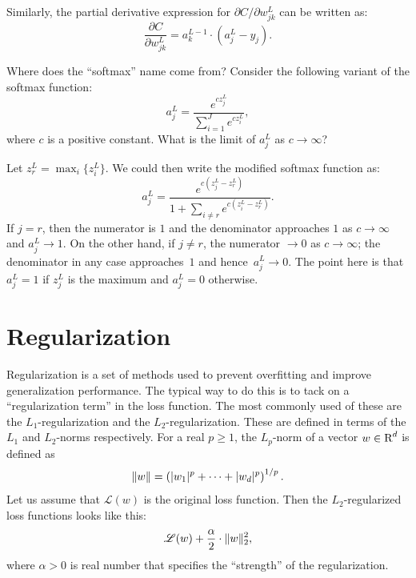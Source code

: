 Similarly, the partial derivative expression for  $\partial C / \partial w_{j k}^L$
can be written as:
\begin{equation}
\frac{\partial C}{\partial w_{j k}^L} = a_{k}^{L - 1} \cdot (a_{j}^L - y_j). 
\end{equation}

\begin{exercise}
Where does the ``softmax'' name come from? Consider the following variant 
of the softmax function:
\[
    a_j^L =  \frac{e^{c z_j^L}}{ \sum_{i = 1}^J e^{c z_i^L}},
\]
where $c$ is a positive constant. What is the limit of $a_j^L$ 
as $c \to \infty$?
\end{exercise}
\begin{solution}
Let $z_r^L = \max_i \{z_i^L\}$. We could then write the modified softmax
function as:
\[
    a_j^L =  \frac{e^{c (z_j^L - z_r^L)}}{ 1 + \sum_{i \neq r} e^{c (z_i^L - z_r^L)}}. 
\]
If $j = r$, then the numerator is $1$ and the denominator approaches $1$ as $c \to \infty$
and $a_j^L \to 1$. On the other hand, if $j \neq r$, the numerator $\to 0$ as $c \to \infty$;
the denominator in any case approaches~$1$ and hence~$a_j^L \to 0$. The point here is 
that $a_j^L = 1$ if $z_j^L$ is the maximum and $a_j^L = 0$ otherwise. 
\end{solution}

\section{Regularization}

Regularization is a set of methods used to prevent overfitting and improve 
generalization performance. The typical way to do this is to tack on a 
``regularization term'' in the loss function. The most commonly used of these 
are the $L_1$-regularization and the 
$L_2$-regularization. These are defined in terms of the $L_1$ and $L_2$-norms 
respectively. For a real $p \geq 1$, the $L_p$-norm of a vector $w \in \text{R}^d$ is defined as  
\begin{equation}
    \lVert w\rVert = \left ( |w_1|^p + \cdots + |w_d|^p \right )^{1/p}.
\end{equation}
Let us assume that $\mathscr{L}(w)$ is the original loss function. Then the 
$L_2$-regularized loss functions looks like this:
\[
    \mathscr{L}(w) + \frac{\alpha}{2} \cdot \lVert w\rVert_2^2,
\]
where $\alpha > 0$ is real number that specifies the ``strength'' of the 
regularization. 

